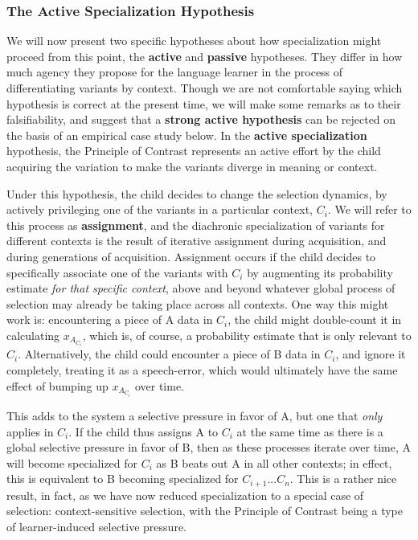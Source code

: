 \subsubsection{The Active Specialization Hypothesis}

We will now present two specific hypotheses about how specialization might proceed from this point, the \textbf{active} and \textbf{passive} hypotheses.
They differ in how much agency they propose for the language learner in the process of differentiating variants by context.
Though we are not comfortable saying which hypothesis is correct at the present time, we will make some remarks as to their falsifiability, and suggest that a \textbf{strong active hypothesis} can be rejected on the basis of an empirical case study below.
In the \textbf{active specialization} hypothesis, the Principle of Contrast represents an active effort by the child acquiring the variation to make the variants diverge in meaning or context.

Under this hypothesis, the child decides to change the selection dynamics, by actively privileging one of the variants in a particular context, $C_i$.
We will refer to this process as \textbf{assignment}, and the diachronic specialization of variants for different contexts is the result of iterative assignment during acquisition, and during generations of acquisition.
Assignment occurs if the child decides to specifically associate one of the variants with $C_i$ by augmenting its probability estimate \textsl{for that specific context}, above and beyond whatever global process of selection may already be taking place across all contexts.
One way this might work is: encountering a piece of A data in $C_i$, the child might double-count it in calculating $x_{A_{C_i}}$, which is, of course, a probability estimate that is only relevant to $C_i$.
Alternatively, the child could encounter a piece of B data in $C_i$, and ignore it completely, treating it as a speech-error, which would ultimately have the same effect of bumping up $x_{A_{C_i}}$ over time.

This adds to the system a selective pressure in favor of A, but one that \textsl{only} applies in $C_i$.
If the child thus assigns A to $C_i$ at the same time as there is a global selective pressure in favor of B, then as these processes iterate over time, A will become specialized for $C_i$ as B beats out A in all other contexts; in effect, this is equivalent to B becoming specialized for $C_{i+1}$...$C_n$.
This is a rather nice result, in fact, as we have now reduced specialization to a special case of selection: context-sensitive selection, with the Principle of Contrast being a type of learner-induced selective pressure.

